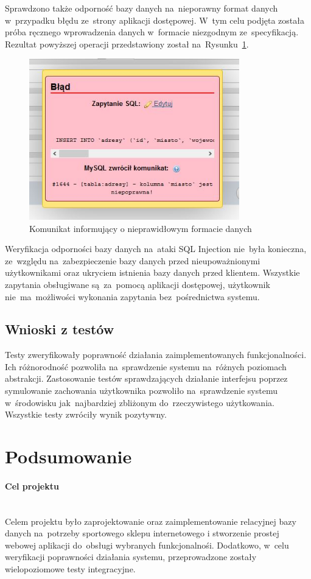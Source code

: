\documentclass[a4paper, 12pt]{article}
\begin{document}
Sprawdzono także odporność bazy danych na~nieporawny format danych w~przypadku błędu ze~strony aplikacji dostępowej. W~tym celu podjęta została próba ręcznego wprowadzenia danych w~formacie niezgodnym ze~specyfikacją. Rezultat powyższej operacji przedstawiony został na~Rysunku~\ref{fig:testTriggera}.
\begin{figure}[H]
	\centering
	\includegraphics[height=7cm]{Screeny/TriggerDziala.JPG}
	\caption[Rezultat testu triggera]{Komunikat informujący o nieprawidłowym formacie danych}
	\label{fig:testTriggera}
\end{figure}
Weryfikacja odporności bazy danych na~ataki SQL Injection nie~była konieczna, ze~względu na~zabezpieczenie bazy danych przed nieupoważnionymi użytkownikami oraz ukryciem istnienia bazy danych przed klientem. Wszystkie zapytania obsługiwane są~za~pomocą aplikacji dostępowej, użytkownik nie~ma~możliwości wykonania zapytania bez~pośrednictwa systemu.
\subsection{Wnioski z testów}
Testy zweryfikowały poprawność działania zaimplementowanych funkcjonalności. Ich różnorodność pozwoliła na~sprawdzenie systemu na~różnych poziomach abstrakcji. Zastosowanie testów sprawdzających działanie interfejsu poprzez symulowanie zachowania użytkownika pozwoliło na~sprawdzenie systemu w~środowisku jak~najbardziej zbliżonym do~rzeczywistego użytkowania. Wszystkie testy zwróciły wynik pozytywny.
\cleardoublepage
\section{Podsumowanie}
\paragraph{Cel projektu} \mbox{}\\
Celem projektu było zaprojektowanie oraz zaimplementowanie relacyjnej bazy danych na~potrzeby sportowego sklepu internetowego i stworzenie prostej webowej aplikacji do~obsługi wybranych funkcjonalnośi. Dodatkowo, w~celu weryfikacji poprawności działania systemu, przeprowadzone zostały wielopoziomowe testy integracyjne.
\end{document}
